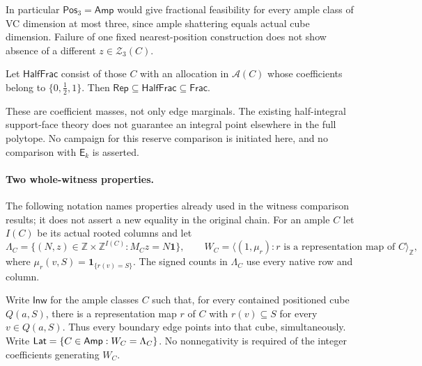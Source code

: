In particular $\mathsf{Pos}_3=\mathsf{Amp}$ would give fractional
feasibility for every ample class of VC dimension at most three, since
ample shattering equals actual cube dimension. Failure of one fixed
nearest-position construction does not show absence of a different
$z\in\mathcal Z_3(C)$.

\begin{definition}
\label{def:refinement-half-integral}
Let $\mathsf{HalfFrac}$ consist of those $C$ with an allocation in
$\mathcal A(C)$ whose coefficients belong to $\{0,\tfrac12,1\}$.
Then $\mathsf{Rep}\subseteq\mathsf{HalfFrac}\subseteq\mathsf{Frac}$.
\end{definition}
These are coefficient masses, not only edge marginals. The existing
half-integral support-face theory does not guarantee an integral point
elsewhere in the full polytope. No campaign for this reserve comparison
is initiated here, and no comparison with $\mathsf E_k$ is asserted.

\paragraph{Two whole-witness properties.}
The following notation names properties already used in the witness
comparison results; it does not assert a new equality in the original chain.
For an ample $C$ let $I(C)$ be its actual rooted columns and let
\[
 \Lambda_C=\{(N,z)\in\mathbb Z\times\mathbb Z^{I(C)}:
                         M_Cz=N\mathbf1\},\qquad
 W_C=\langle(1,\mu_r):r\text{ is a representation map of }C\rangle_{\mathbb Z},
\]
where $\mu_r(v,S)=\mathbf1_{\{r(v)=S\}}$.
The signed counts in $\Lambda_C$ use every native row and column.

\begin{definition}
\label{def:atlas-witness-properties}
Write $\mathsf{Inw}$ for the ample classes $C$ such that, for every
contained positioned cube $Q(a,S)$, there is a representation map $r$
of $C$ with $r(v)\subseteq S$ for every $v\in Q(a,S)$.
Thus every boundary edge points into that cube, simultaneously.
Write $\mathsf{Lat}=\{C\in\mathsf{Amp}:W_C=\Lambda_C\}$.
No nonnegativity is required of the integer coefficients generating $W_C$.
\end{definition}

